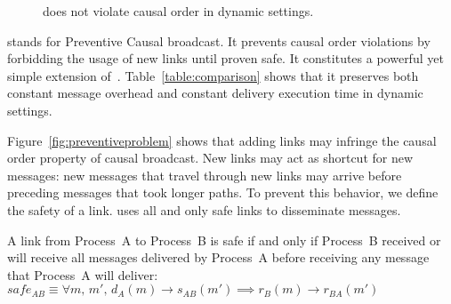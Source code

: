 \begin{figure*}
  \begin{center}
    \hspace{20pt}
    \hspace{20pt}
    \hspace{20pt}
    \hspace{20pt}
    \caption{\label{fig:preventivesolve}\CBROADCAST does not violate causal
      order in dynamic settings.}
  \end{center}
\end{figure*}


\CBROADCAST stands for Preventive Causal broadcast. It prevents causal order
violations by forbidding the usage of new links until proven safe. It
constitutes a powerful yet simple extension
of~\cite{friedman2004causal}. Table~\ref{table:comparison} shows that it
preserves both constant message overhead and constant delivery execution time in
dynamic settings.

Figure~\ref{fig:preventiveproblem} shows that adding links may infringe the
causal order property of causal broadcast.  New links may act as shortcut for
new messages: new messages that travel through new links may arrive before
preceding messages that took longer paths. To prevent this behavior, we define
the safety of a link. \CBROADCAST uses all and only safe links to disseminate
messages.

\begin{definition}
  A link from Process~A to Process~B is safe if and only if Process~B received
  or will receive all messages delivered by Process~A before receiving any
  message that Process~A will deliver:
  $safe_{AB} \equiv \forall m,\, m',\, d_A(m) \rightarrow s_{AB}(m') \implies
  r_B(m) \rightarrow r_{BA}(m')$
\end{definition}

